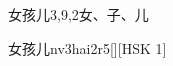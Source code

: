 \begin{entry}{女孩儿}{3,9,2}{⼥、⼦、⼉}
  \begin{phonetics}{女孩儿}{nv3hai2r5}[][HSK 1]
  \end{phonetics}
\end{entry}
